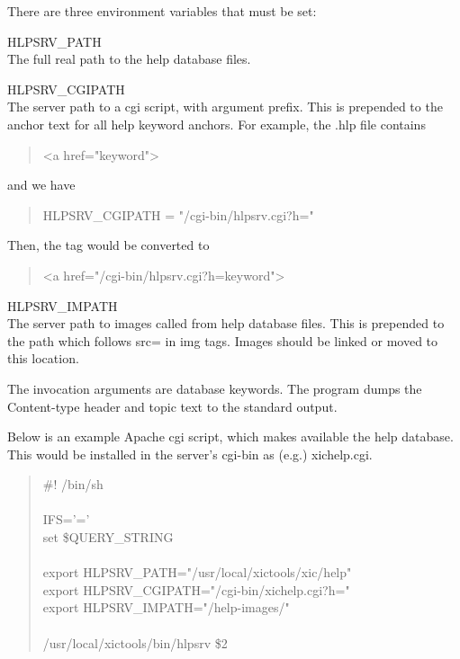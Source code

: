There are three environment variables that must be set:
\begin{description}
\item{\vt HLPSRV\_PATH}\\
The full real path to the help database files.

\item{\vt HLPSRV\_CGIPATH}\\
The server path to a cgi script, with argument prefix.  This is
prepended to the anchor text for all help keyword anchors.  For
example, the {\vt .hlp} file contains
\begin{quote} \vt
<a href="keyword">
\end{quote}
and we have
\begin{quote} \vt
HLPSRV\_CGIPATH = "/cgi-bin/hlpsrv.cgi?h="
\end{quote}
Then, the tag would be converted to
\begin{quote} \vt
<a href="/cgi-bin/hlpsrv.cgi?h=keyword">
\end{quote}

\item{\vt HLPSRV\_IMPATH}\\
The server path to images called from help database files.  This is
prepended to the path which follows {\vt src=} in {\vt img} tags. 
Images should be linked or moved to this location.
\end{description}

The invocation arguments are database keywords.  The program dumps the
{\vt Content-type} header and topic text to the standard output.

Below is an example Apache cgi script, which makes available the
{\Xic} help database.  This would be installed in the server's
{\vt cgi-bin} as (e.g.) {\vt xichelp.cgi}.

\begin{quote}\vt
\#! /bin/sh\\
\\
IFS='='\\
set \$QUERY\_STRING\\
\\
export HLPSRV\_PATH="/usr/local/xictools/xic/help"\\
export HLPSRV\_CGIPATH="/cgi-bin/xichelp.cgi?h="\\
export HLPSRV\_IMPATH="/help-images/"\\
\\
/usr/local/xictools/bin/hlpsrv \$2\\
\end{quote}

